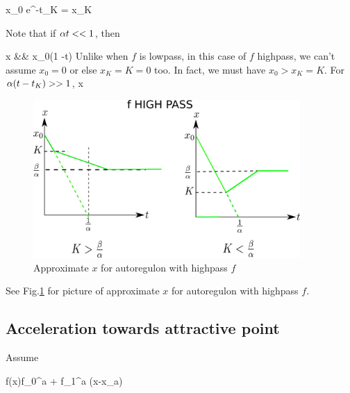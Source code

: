 \beq
x_0 e^{-\alp t_K} = x_K
\eeq

Note that if $\alpha t<<1$, then

\beqa
x &\approx&
x_0(1 -\alp t)
\eeqa
Unlike when $f$ is lowpass, 
in this case of $f$ highpass,
we can't assume $x_0=0$ or else $x_K=K=0$ too. In fact, we must have $x_0 > x_K=K$. For $\alpha (t-t_K) >>1$, 
\beq
x\approx \frac{\beta}{\alp}
\eeq

\begin{figure}[h!]
\centering
\includegraphics[width=4in]
{autoregulons/autoreg-highpass.png}
\caption{Approximate $x$ for autoregulon with highpass $f$}
\label{fig-autoreg-highpass}
\end{figure}
See Fig.\ref{fig-autoreg-highpass}
for picture of 
approximate $x$ for autoregulon with highpass $f$.




\subsection{Acceleration towards attractive point}

Assume 

\beq
f(x)\approx f_0^a + f_1^a (x-x_a)
\eeq

